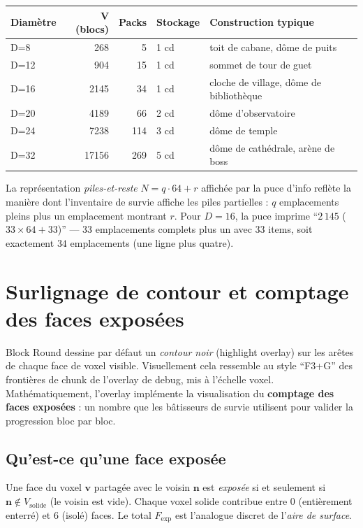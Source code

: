 \documentclass[12pt,a4paper]{scrartcl}
\newcommand{\acc}[1]{\textcolor{accent}{\textbf{#1}}}
\begin{document}
\vspace{0.4em}
\begin{center}
\small
\begin{tabularx}{\textwidth}{@{}lrrlX@{}}
\toprule
\textbf{Diamètre} & \textbf{V (blocs)} & \textbf{Packs} & \textbf{Stockage} & \textbf{Construction typique} \\
\midrule
D=8   &   268 &  5  &  1 cd & toit de cabane, dôme de puits  \\
D=12  &   904 & 15  &  1 cd & sommet de tour de guet \\
D=16  &  2145 & 34  &  1 cd & cloche de village, dôme de bibliothèque \\
D=20  &  4189 & 66  &  2 cd & dôme d'observatoire \\
D=24  &  7238 & 114 &  3 cd & dôme de temple \\
D=32  & 17156 & 269 &  5 cd & dôme de cathédrale, arène de boss \\
\bottomrule
\end{tabularx}
\end{center}

La représentation \emph{piles-et-reste} $N = q \cdot 64 + r$ affichée par la puce d'info reflète la manière dont l'inventaire de survie affiche les piles partielles : $q$ emplacements pleins plus un emplacement montrant $r$. Pour $D=16$, la puce imprime \enquote{$2\,145$ ($33 \times 64 + 33$)} --- $33$ emplacements complets plus un avec $33$ items, soit exactement $34$ emplacements (une ligne plus quatre).

\section{Surlignage de contour et comptage des faces exposées}

Block Round dessine par défaut un \emph{contour noir} (highlight overlay) sur les arêtes de chaque face de voxel visible. Visuellement cela ressemble au style \enquote{F3+G} des frontières de chunk de l'overlay de debug, mis à l'échelle voxel. Mathématiquement, l'overlay implémente la visualisation du \acc{comptage des faces exposées} : un nombre que les bâtisseurs de survie utilisent pour valider la progression bloc par bloc.

\subsection{Qu'est-ce qu'une face exposée}
Une face du voxel $\mathbf{v}$ partagée avec le voisin $\mathbf{n}$ est \emph{exposée} si et seulement si $\mathbf{n} \notin V_{\mathrm{solide}}$ (le voisin est vide). Chaque voxel solide contribue entre $0$ (entièrement enterré) et $6$ (isolé) faces. Le total $F_{\mathrm{exp}}$ est l'analogue discret de l'\emph{aire de surface}.
\end{document}
